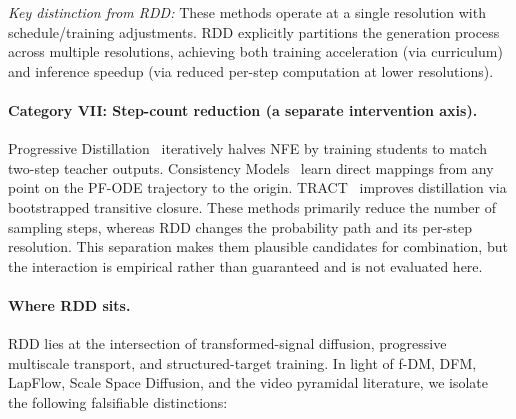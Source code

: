 \documentclass[10pt]{article}
\begin{document}
\emph{Key distinction from RDD:} These methods operate at a single resolution with schedule/training adjustments. RDD explicitly partitions the generation process across multiple resolutions, achieving both training acceleration (via curriculum) and inference speedup (via reduced per-step computation at lower resolutions).

\paragraph{Category VII: Step-count reduction (a separate intervention axis).}
Progressive Distillation~\citep{salimans2022distillation} iteratively halves NFE by training students to match two-step teacher outputs.
Consistency Models~\citep{song2023consistency} learn direct mappings from any point on the PF-ODE trajectory to the origin.
TRACT~\citep{berthelot2023tract} improves distillation via bootstrapped transitive closure.
These methods primarily reduce the number of sampling steps, whereas RDD changes the probability path and its per-step resolution. This separation makes them plausible candidates for combination, but the interaction is empirical rather than guaranteed and is not evaluated here.

\paragraph{Where RDD sits.}
RDD lies at the intersection of transformed-signal diffusion, progressive multiscale transport, and structured-target training. In light of f-DM, DFM, LapFlow, Scale Space Diffusion, and the video pyramidal literature, we isolate the following falsifiable distinctions:
\end{document}
